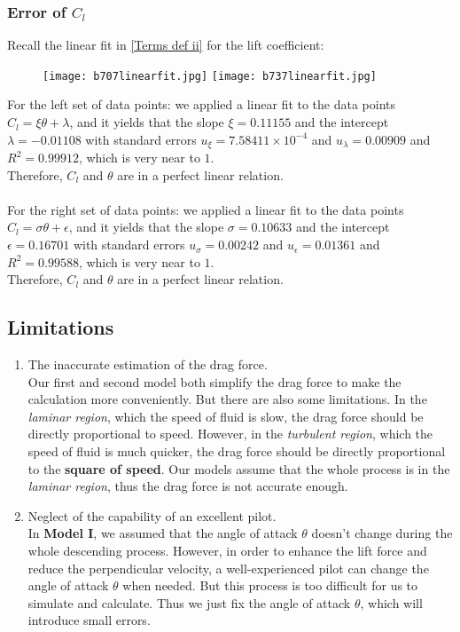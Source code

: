 \documentclass[a4paper,11pt]{article}
\begin{document}
\begin{spacing}{1.0}
\subsubsection*{Error of $C_l$}
Recall the linear fit in \ref{Terms def ii} for the lift coefficient:
\begin{figure}[H]
	\centering
	\texttt{[image: b707linearfit.jpg]}
	\texttt{[image: b737linearfit.jpg]}
\end{figure}
\noindent For the left set of data points: we applied a linear fit to the data points  $C_l = \xi \theta + \lambda$, and it yields that the slope $\xi = 0.11155 $ and the intercept $\lambda = -0.01108 $ with standard errors $u_\xi = 7.58411\times 10^{-4} $ and $u_\lambda = 0.00909$ and $R^2 = 0.99912$, which is very near to $1$.
\\Therefore, $C_l$ and $\theta$ are in a perfect linear relation.
\\~
\\For the right set of data points: we applied a linear fit to the data points  $C_l = \sigma \theta + \epsilon$, and it yields that the slope $\sigma = 0.10633$ and the intercept $\epsilon = 0.16701 $ with standard errors $u_\sigma = 0.00242 $ and $u_\epsilon = 0.01361$ and $R^2 = 0.99588$, which is very near to $1$.
\\Therefore, $C_l$ and $\theta$ are in a perfect linear relation.

\subsection{Limitations}
\begin{enumerate}
	\item The inaccurate estimation of the drag force.
	\\Our first and second model  both simplify the drag force to make the calculation more conveniently. But there are also some limitations. In the \textit{laminar region}, which the speed of fluid is slow, the drag force should be directly proportional to speed. However, in the \textit{turbulent region}, which the speed of fluid is much quicker, the drag force should be directly proportional to the \textbf{square of speed}. Our models assume that the whole process is in the \textit{laminar region}, thus the drag force is not accurate enough.
	
	\item Neglect of the capability of an excellent pilot.
	\\In \textbf{Model I}, we assumed that the angle of attack $\theta$ doesn't change during the whole descending process. However, in order to enhance the lift force and reduce the perpendicular velocity, a well-experienced pilot can change the angle of attack $\theta$ when needed. But this process is too difficult for us to simulate and calculate. Thus we just fix the angle of attack $\theta$, which will introduce small errors.
	

\end{enumerate}
\end{spacing}
\end{document}
